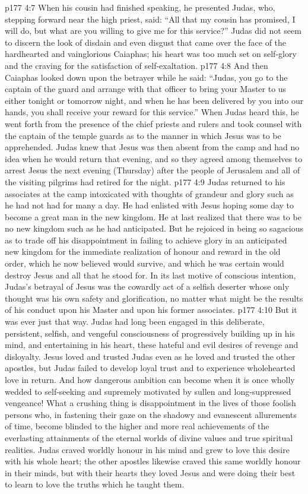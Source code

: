 \vs p177 4:7 When his cousin had finished speaking, he presented Judas, who, stepping forward near the high priest, said: “All that my cousin has promised, I will do, but what are you willing to give me for this service?” Judas did not seem to discern the look of disdain and even disgust that came over the face of the hardhearted and vainglorious Caiaphas; his heart was too much set on self\hyp{}glory and the craving for the satisfaction of self\hyp{}exaltation.
\vs p177 4:8 And then Caiaphas looked down upon the betrayer while he said: “Judas, you go to the captain of the guard and arrange with that officer to bring your Master to us either tonight or tomorrow night, and when he has been delivered by you into our hands, you shall receive your reward for this service.” When Judas heard this, he went forth from the presence of the chief priests and rulers and took counsel with the captain of the temple guards as to the manner in which Jesus was to be apprehended. Judas knew that Jesus was then absent from the camp and had no idea when he would return that evening, and so they agreed among themselves to arrest Jesus the next evening (Thursday) after the people of Jerusalem and all of the visiting pilgrims had retired for the night.
\vs p177 4:9 Judas returned to his associates at the camp intoxicated with thoughts of grandeur and glory such as he had not had for many a day. He had enlisted with Jesus hoping some day to become a great man in the new kingdom. He at last realized that there was to be no new kingdom such as he had anticipated. But he rejoiced in being so sagacious as to trade off his disappointment in failing to achieve glory in an anticipated new kingdom for the immediate realization of honour and reward in the old order, which he now believed would survive, and which he was certain would destroy Jesus and all that he stood for. In its last motive of conscious intention, Judas’s betrayal of Jesus was the cowardly act of a selfish deserter whose only thought was his own safety and glorification, no matter what might be the results of his conduct upon his Master and upon his former associates.
\vs p177 4:10 But it was ever just that way. Judas had long been engaged in this deliberate, persistent, selfish, and vengeful consciousness of progressively building up in his mind, and entertaining in his heart, these hateful and evil desires of revenge and disloyalty. Jesus loved and trusted Judas even as he loved and trusted the other apostles, but Judas failed to develop loyal trust and to experience wholehearted love in return. And how dangerous ambition can become when it is once wholly wedded to self\hyp{}seeking and supremely motivated by sullen and long\hyp{}suppressed vengeance! What a crushing thing is disappointment in the lives of those foolish persons who, in fastening their gaze on the shadowy and evanescent allurements of time, become blinded to the higher and more real achievements of the everlasting attainments of the eternal worlds of divine values and true spiritual realities. Judas craved worldly honour in his mind and grew to love this desire with his whole heart; the other apostles likewise craved this same worldly honour in their minds, but with their hearts they loved Jesus and were doing their best to learn to love the truths which he taught them.
